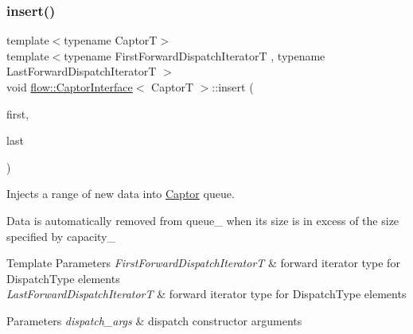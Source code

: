 \subsubsection{\texorpdfstring{insert()}{insert()}}
{\footnotesize\ttfamily template$<$typename CaptorT$>$ \\
template$<$typename First\+Forward\+Dispatch\+IteratorT , typename Last\+Forward\+Dispatch\+IteratorT $>$ \\
void \hyperlink{classflow_1_1_captor_interface}{flow\+::\+Captor\+Interface}$<$ CaptorT $>$\+::insert (\begin{DoxyParamCaption}\item[{First\+Forward\+Dispatch\+IteratorT \&\&}]{first,  }\item[{Last\+Forward\+Dispatch\+IteratorT \&\&}]{last }\end{DoxyParamCaption})\hspace{0.3cm}{\ttfamily [inline]}}



Injects a range of new data into \hyperlink{classflow_1_1_captor}{Captor} queue. 

Data is automatically removed from {\ttfamily queue\+\_\+} when its size is in excess of the size specified by {\ttfamily capacity\+\_\+}


\begin{DoxyTemplParams}{Template Parameters}
{\em First\+Forward\+Dispatch\+IteratorT} & forward iterator type for {\ttfamily Dispatch\+Type} elements \\
\hline
{\em Last\+Forward\+Dispatch\+IteratorT} & forward iterator type for {\ttfamily Dispatch\+Type} elements\\
\hline
\end{DoxyTemplParams}

\begin{DoxyParams}{Parameters}
{\em dispatch\+\_\+args} & dispatch constructor arguments \\
\hline
\end{DoxyParams}
\mbox{\label{classflow_1_1_captor_interface_ab1add272b1b90192edb6c567847140e7}} 
